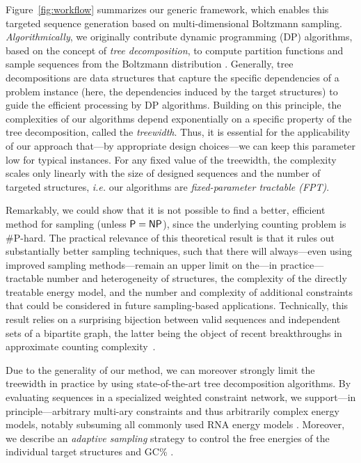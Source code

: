 \documentclass[]{bmcart}
\newcommand{\Def}[1]{\emph{#1}}
\newcommand{\Nuc}[1]{{\sf #1}}
\newcommand{\Cb}{\Nuc{C}}
\newcommand{\Gb}{\Nuc{G}}
\newcommand{\GCb}{\Gb\Cb}
\newcommand{\citep}[1]{\cite{#1}}
\newcommand{\revised}[1]{{\color{red} #1}}
\begin{document}
\revised{Figure~\ref{fig:workflow} summarizes our generic framework, which enables this targeted sequence generation based on multi-dimensional Boltzmann sampling. \emph{Algorithmically}, we originally contribute} dynamic programming (DP) algorithms, based on the concept of \Def{tree decomposition}, to compute partition functions and sample sequences from the Boltzmann distribution%
.
\revised{Generally, tree decompositions are data structures that capture the specific dependencies of a problem instance (here, the dependencies induced by the target structures) to guide the efficient processing by DP algorithms.}
%
\revised{Building on this principle, the complexities of our algorithms depend exponentially on a specific property of the tree decomposition, called the \Def{treewidth}. Thus, it is essential for the applicability of our approach that---by appropriate design choices---we can keep this parameter low for typical instances. For} any fixed value of the treewidth, the complexity scales only linearly with the size of designed sequences and the number of targeted structures, \emph{i.e.} our algorithms are \emph{fixed-parameter tractable (FPT)}.

\revised{Remarkably, we could show that it is not possible to find a better, efficient method for sampling (unless ${\sf P}={\sf NP}$), since the underlying counting problem is \#{\sf P}-hard. The practical relevance of this theoretical result is that it rules out substantially better sampling techniques, such that there will always---even using improved sampling methods---remain an upper limit on the---in practice---tractable number and heterogeneity of structures, the complexity of the directly treatable energy model, and the number and complexity of additional constraints that could be considered in future sampling-based applications.} Technically, this result relies on a surprising bijection between valid sequences and independent sets of a bipartite graph, the latter being the object of recent breakthroughs in approximate counting complexity~\citep{Bulatov2013,Cai2016}.

%
Due to the generality of our method, we can moreover strongly limit \revised{the treewidth} in practice by using state-of-the-art tree decomposition algorithms.
By evaluating sequences in a specialized weighted constraint
network, we support---in principle---arbitrary multi-ary constraints and thus
arbitrarily complex energy models,
notably subsuming all commonly
used RNA energy models%
.  Moreover, we describe an \Def{adaptive
  sampling} strategy to control the free energies of the individual
target structures and \GCb\%%
. %
\end{document}
